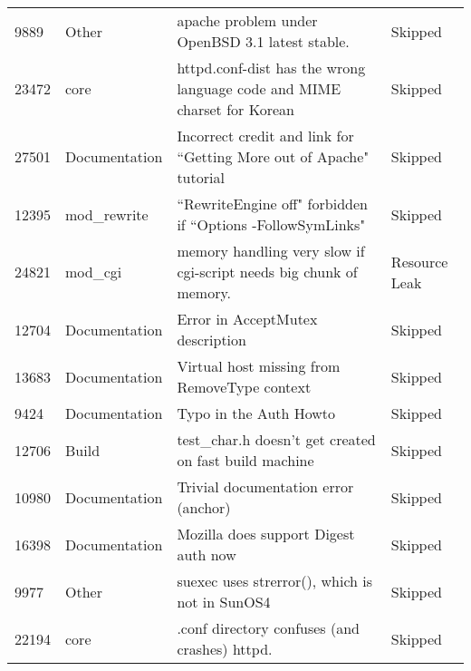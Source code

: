 \begin{longtable}[c]{p{1cm}p{3cm}p{6cm}p{4cm}}
9889   & Other              & apache problem under OpenBSD 3.1 latest stable.                                                                & Skipped           \\
23472  & core               & httpd.conf-dist has the wrong language code and MIME charset  for Korean                                       & Skipped           \\
27501  & Documentation      & Incorrect credit and link for ``Getting More out of Apache" tutorial                                            & Skipped           \\
12395  & mod\_rewrite       & ``RewriteEngine off" forbidden if ``Options -FollowSymLinks"                                                     & Skipped           \\
24821  & mod\_cgi           & memory handling very slow if cgi-script needs big chunk of memory.                                             & Resource Leak     \\
12704  & Documentation      & Error in AcceptMutex description                                                                               & Skipped           \\
13683  & Documentation      & Virtual host missing from RemoveType context                                                                   & Skipped           \\
9424   & Documentation      & Typo in the Auth Howto                                                                                         & Skipped           \\
12706  & Build              & test\_char.h doesn't get created on fast build machine                                                         & Skipped           \\
10980  & Documentation      & Trivial documentation error (anchor)                                                                           & Skipped           \\
16398  & Documentation      & Mozilla does support Digest auth now                                                                           & Skipped           \\
9977   & Other              & suexec uses strerror(), which is not in SunOS4                                                                 & Skipped           \\
22194  & core               & \*.conf directory confuses (and crashes) httpd.                                                                & Skipped           \\

\end{longtable}
